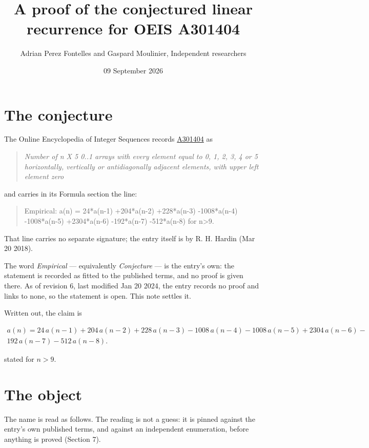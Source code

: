 \documentclass[11pt]{article}
\title{A proof of the conjectured linear recurrence for OEIS A301404}
\author{Adrian Perez Fontelles and Gaspard Moulinier, Independent researchers}
\date{09 September 2026}
\theoremstyle{definition}
\begin{document}
\maketitle
\section{The conjecture}

The Online Encyclopedia of Integer Sequences records \href{https://oeis.org/A301404}{A301404} as

\begin{quote}\itshape Number of n X 5 0..1 arrays with every element equal to 0, 1, 2, 3, 4 or 5 horizontally, vertically or antidiagonally adjacent elements, with upper left element zero\end{quote}

and carries in its Formula section the line:

\begin{quote}\ttfamily Empirical: a(n) = 24*a(n-1) +204*a(n-2) +228*a(n-3) -1008*a(n-4) -1008*a(n-5) +2304*a(n-6) -192*a(n-7) -512*a(n-8) for n>9.\end{quote}

That line carries no separate signature; the entry itself is by R. H. Hardin (Mar 20 2018).

The word {\itshape Empirical} --- equivalently {\itshape Conjecture} --- is the entry's own: the statement is recorded as fitted to the published terms, and no proof is given there. As of revision 6, last modified Jan 20 2024, the entry records no proof and links to none, so the statement is open. This note settles it.

Written out, the claim is

\begin{multline*} a(n) = 24\,a(n-1) + 204\,a(n-2) + 228\,a(n-3) - 1008\,a(n-4) - 1008\,a(n-5) + 2304\,a(n-6) - \\ 192\,a(n-7) - 512\,a(n-8). \end{multline*}

stated for $n > 9$.

\section{The object}

The name is read as follows. The reading is not a guess: it is pinned against the entry's own published terms, and against an independent enumeration, before anything is proved (Section 7).
\end{document}
